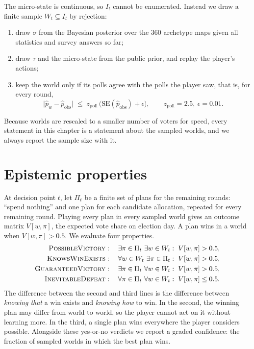 \documentclass[11pt,a4paper,oneside]{report}
\begin{document}
The micro-state is continuous, so $I_t$ cannot be enumerated. Instead we draw a finite sample
$W_t \subseteq I_t$ by rejection:
\begin{enumerate}
  \item draw $\sigma$ from the Bayesian posterior over the 360 archetype maps given all statistics and
        survey answers so far;
  \item draw $\tau$ and the micro-state from the public prior, and replay the player's actions;
  \item keep the world only if its polls agree with the polls the player saw, that is, for every round,
        \begin{equation}
          \lvert \hat p_w - \hat p_{\mathrm{obs}} \rvert \;\le\; z_{\mathrm{poll}}\,
          \bigl(\mathrm{SE}(\hat p_{\mathrm{obs}}) + \epsilon\bigr), \qquad z_{\mathrm{poll}} = 2.5,\ \epsilon = 0.01 .
        \end{equation}
\end{enumerate}
Because worlds are rescaled to a smaller number of voters for speed, every statement in this chapter is a
statement about the sampled worlds, and we always report the sample size with it.

\section{Epistemic properties}

At decision point $t$, let $\Pi_t$ be a finite set of plans for the remaining rounds: ``spend nothing'' and
one plan for each candidate allocation, repeated for every remaining round. Playing every plan in every
sampled world gives an outcome matrix $V[w,\pi]$, the expected vote share on election day. A plan wins in a
world when $V[w,\pi] > 0.5$. We evaluate four properties.
\begin{align}
  \textsc{PossibleVictory}   &:\quad \exists \pi \in \Pi_t\ \exists w \in W_t:\ V[w,\pi] > 0.5, \\
  \textsc{KnowsWinExists}    &:\quad \forall w \in W_t\ \exists \pi \in \Pi_t:\ V[w,\pi] > 0.5, \\
  \textsc{GuaranteedVictory} &:\quad \exists \pi \in \Pi_t\ \forall w \in W_t:\ V[w,\pi] > 0.5, \\
  \textsc{InevitableDefeat}  &:\quad \forall \pi \in \Pi_t\ \forall w \in W_t:\ V[w,\pi] \le 0.5 .
\end{align}
The difference between the second and third lines is the difference between \emph{knowing that} a win
exists and \emph{knowing how} to win. In the second, the winning plan may differ from world to world, so
the player cannot act on it without learning more. In the third, a single plan wins everywhere the player
considers possible. Alongside these yes-or-no verdicts we report a graded confidence: the fraction of
sampled worlds in which the best plan wins.
\end{document}
